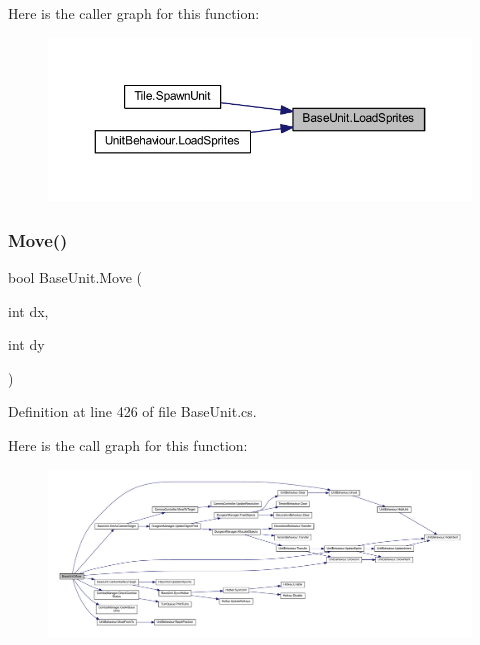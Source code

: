 Here is the caller graph for this function\+:
\nopagebreak
\begin{figure}[H]
\begin{center}
\leavevmode
\includegraphics[width=350pt]{class_base_unit_ab93bf1d3c3ca2899d591a936760d46cf_icgraph}
\end{center}
\end{figure}
\mbox{\label{class_base_unit_af7d5e0c6e087b3e5c8af203dfb11268b}} 
\subsubsection{\texorpdfstring{Move()}{Move()}}
{\footnotesize\ttfamily bool Base\+Unit.\+Move (\begin{DoxyParamCaption}\item[{int}]{dx,  }\item[{int}]{dy }\end{DoxyParamCaption})}



Definition at line 426 of file Base\+Unit.\+cs.

Here is the call graph for this function\+:
\nopagebreak
\begin{figure}[H]
\begin{center}
\leavevmode
\includegraphics[width=350pt]{class_base_unit_af7d5e0c6e087b3e5c8af203dfb11268b_cgraph}
\end{center}
\end{figure}
\mbox{\label{class_base_unit_a8412f2b3e8ec9c3ff75b41b830fde443}} 
